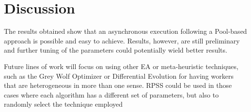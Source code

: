 \documentclass[sigconf]{acmart}
\begin{document}
\section{Discussion}  %
The results obtained show that an asynchronous execution 
following a Pool-based approach is  possible and easy to achieve.
Results, however, are still preliminary and further tuning of the parameters could 
potentially wield better results.

Future lines of work will focus on using other EA or 
meta-heuristic techniques, such as the Grey Wolf Optimizer \cite{mirjalili2014grey}
or Differential Evolution \cite{storn1997differential} for having workers that are 
heterogeneous in more than one sense. RPSS could be used 
in those cases where each algorithm has a different set of 
parameters, but also to randomly select the technique employed 


 

\clearpage %
\end{document}
